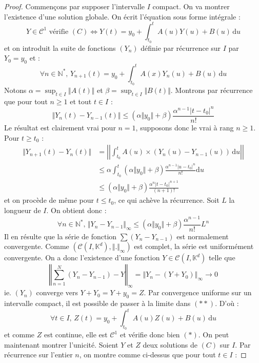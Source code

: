 	\begin{proof}
		Commençons par supposer l'intervalle $I$ compact. On va montrer l'existence d'une solution globale. On écrit l'équation sous forme intégrale :
		\[ Y \in \mathcal{C}^1 \text{ vérifie } (C) \iff Y(t) = y_0 + \int_{t_0}^t A(u) Y(u) + B(u) \, \mathrm{d}u \tag{$*$} \]
		et on introduit la suite de fonctions $(Y_n)$ définie par récurrence sur $I$ par $Y_0 = y_0$ et :
		\[ \forall n \in \mathbb{N}^*, \, Y_{n+1}(t) = y_0 + \int_{t_0}^t A(x) Y_n(u) + B(u) \, \mathrm{d}u \tag{$**$} \]
		Notons $\alpha = \sup_{t \in I} \Vert A(t) \Vert$ et $\beta = \sup_{t \in I} \Vert B(t) \Vert$. Montrons par récurrence que pour tout $n \geq 1$ et tout $t \in I$ :
		\[ \Vert Y_n(t) - Y_{n-1}(t) \Vert \leq (\alpha \Vert y_0 \Vert + \beta) \frac{\alpha^{n-1} |t-t_0|^n}{n!} \]
		Le résultat est clairement vrai pour $n = 1$, supposons donc le vrai à rang $n \geq 1$. Pour $t \geq t_0$ :
		\begin{align*}
			\Vert Y_{n+1}(t) - Y_n(t) \Vert &= \left| \left| \int_{t_0}^t A(u) \times (Y_n(u) - Y_{n-1}(u)) \, \mathrm{d}u \right| \right| \\
			&\leq \alpha \int_{t_0}^t (\alpha \Vert y_0 \Vert + \beta) \frac{\alpha^{n-1} |u-t_0|^n}{n!} \mathrm{d}u \\
			&\leq (\alpha \Vert y_0 \Vert + \beta) \frac{\alpha^n |t-t_0|^{n+1}}{(n+1)!}
		\end{align*}
		et on procède de même pour $t \leq t_0$, ce qui achève la récurrence.
		\newpar
		Soit $L$ la longueur de $I$. On obtient donc :
		\[ \forall n \in \mathbb{N}^*, \, \Vert Y_n - Y_{n-1} \Vert_{\infty} \leq (\alpha \Vert y_0 \Vert + \beta) \frac{\alpha^{n-1}}{n!} L^n \]
		Il en résulte que la série de fonction $\sum (Y_n - Y_{n-1})$ est normalement convergente. Comme $(\mathcal{C} (I, \mathbb{K}^d), \Vert . \Vert_{\infty})$ est complet, la série est uniformément convergente. On a donc l'existence d'une fonction $Y \in \mathcal{C} (I, \mathbb{K}^d)$ telle que
		\[ \left \Vert \sum_{n=1}^N (Y_n - Y_{n-1}) - Y \right \Vert_\infty = \left \Vert Y_n - (Y + Y_0) \right \Vert_\infty \longrightarrow 0 \]
		ie. $(Y_n)$ converge vers $Y + Y_0 = Y + y_0 = Z$. Par convergence uniforme sur un intervalle compact, il est possible de passer à la limite dans $(**)$. D'où :
		\[ \forall t \in I, \, Z(t) = y_0 + \int_{t_0}^t A(u) Z(u) + B(u) \, \mathrm{d}u \]
		et comme $Z$ est continue, elle est $\mathcal{C}^1$ et vérifie donc bien $(*)$.
		\newpar
		On peut maintenant montrer l'unicité. Soient $Y$ et $Z$ deux solutions de $(C)$ sur $I$. Par récurrence sur l'entier $n$, on montre comme ci-dessus que pour tout $t \in I$ :

\end{proof}
